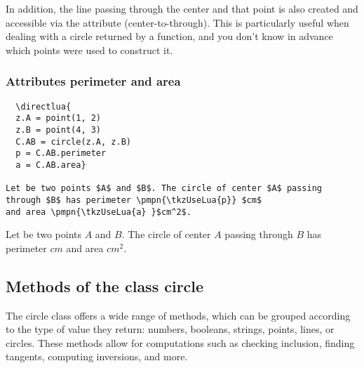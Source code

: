 \medskip
\noindent
In addition, the line passing through the center and that point is also created and accessible via the attribute  (center-to-through). This is particularly useful when dealing with a circle returned by a function, and you don't know in advance which points were used to construct it.

\vspace{1em}

\begin{tkzexample}[latex=7cm]
\begin{center}
\end{center}
\end{tkzexample}


\subsubsection{Attributes perimeter and area}
\label{ssub:attributes_perimeter_and_area}

 \let\pmpn\pgfmathprintnumber

\begin{mybox}
\begin{verbatim}
  \directlua{
  z.A = point(1, 2)
  z.B = point(4, 3)
  C.AB = circle(z.A, z.B)
  p = C.AB.perimeter
  a = C.AB.area}

Let be two points $A$ and $B$. The circle of center $A$ passing
through $B$ has perimeter \pmpn{\tkzUseLua{p}} $cm$
and area \pmpn{\tkzUseLua{a} }$cm^2$.
\end{verbatim}
\end{mybox}


Let be two points $A$ and $B$.
The circle of center $A$ passing through $B$ has perimeter \pmpn{\tkzUseLua{p}} $cm$ and area \pmpn{\tkzUseLua{a} }$cm^2$.


\newpage
\subsection{Methods of the class circle}
The circle class offers a wide range of methods, which can be grouped according to the type of value they return: numbers, booleans, strings, points, lines, or circles. These methods allow for computations such as checking inclusion, finding tangents, computing inversions, and more.

